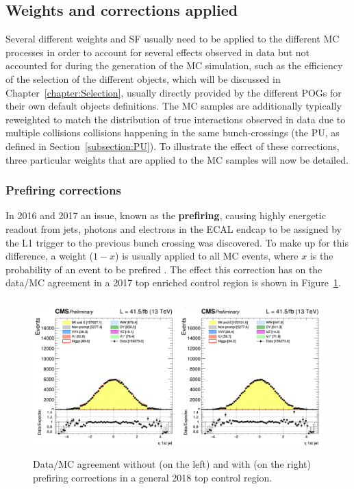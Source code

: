 \documentclass[a4paper, 10pt, openright]{report}
\begin{document}
\subsection{Weights and corrections applied} \label{subsection:Weights}

Several different weights and \ac{SF} usually need to be applied to the different \ac{MC} processes in order to account for several effects observed in data but not accounted for during the generation of the \ac{MC} simulation, such as the efficiency of the selection of the different objects, which will be discussed in Chapter~\ref{chapter:Selection}, usually directly provided by the different \acfp{POG} for their own default objects definitions. The \ac{MC} samples are additionally typically reweighted to match the distribution of true interactions observed in data due to multiple collisions collisions happening in the same bunch-crossings (the \ac{PU}, as defined in Section~\ref{subsection:PU}). To illustrate the effect of these corrections, three particular weights that are applied to the \ac{MC} samples will now be detailed.

\subsubsection{Prefiring corrections}

In 2016 and 2017 an issue, known as the \textbf{prefiring}, causing highly energetic readout from jets, photons and electrons in the \ac{ECAL} endcap to be assigned by the \ac{L1} trigger to the previous bunch crossing was discovered. To make up for this difference, a weight ($1-x$) is usually applied to all \ac{MC} events, where $x$ is the probability of an event to be prefired \cite{Prefire}. The effect this correction has on the data/\ac{MC} agreement in a 2017 top enriched control region is shown in Figure~\ref{fig:Prefiring}.

\begin{figure}[htbp]
\begin{center}
\includegraphics[width=14cm, height=6cm]{figs/Prefiring.png}
\caption{Data/\ac{MC} agreement without (on the left) and with (on the right) prefiring corrections in a general 2018 top control region.}
\label{fig:Prefiring}
\end{center}
\end{figure}
\end{document}
